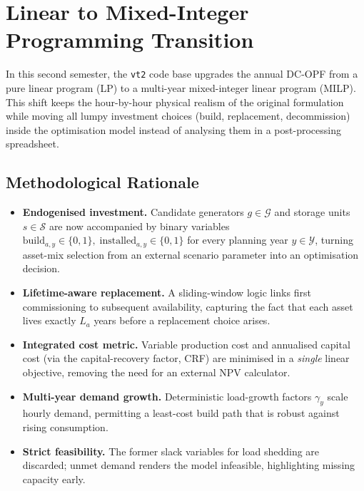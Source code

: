 \newpage
\section{Linear to Mixed-Integer Programming Transition}
\label{sec:MILP_transition}

In this second semester, the \texttt{vt2} code base upgrades the annual DC-OPF from 
a pure linear program (LP) to a multi-year mixed-integer linear program (MILP).  
This shift keeps the hour-by-hour physical realism of the original formulation while 
moving all lumpy investment choices (build, replacement, decommission) inside the 
optimisation model instead of analysing them in a post-processing spreadsheet.

\subsection{Methodological Rationale}
\label{ssec:MILP_methodology}

\begin{itemize}
    \item \textbf{Endogenised investment.}  
          Candidate generators $g\in\mathcal{G}$ and storage units $s\in\mathcal{S}$ 
          are now accompanied by binary variables
          \(
              \text{build}_{a,y}\in\{0,1\},\;
              \text{installed}_{a,y}\in\{0,1\}
          \)
          for every planning year $y\in\mathcal{Y}$, turning asset-mix selection from 
          an external scenario parameter into an optimisation decision.

    \item \textbf{Lifetime-aware replacement.}  
          A sliding-window logic links first commissioning to subsequent availability, 
          capturing the fact that each asset lives exactly $L_a$ years before a 
          replacement choice arises.

    \item \textbf{Integrated cost metric.}  
          Variable production cost and annualised capital cost (via the capital-recovery 
          factor, CRF) are minimised in a \emph{single} linear objective, removing the 
          need for an external NPV calculator.

    \item \textbf{Multi-year demand growth.}  
          Deterministic load-growth factors $\gamma_y$ scale hourly demand, permitting a 
          least-cost build path that is robust against rising consumption.

    \item \textbf{Strict feasibility.}  
          The former slack variables for load shedding are discarded; unmet demand renders 
          the model infeasible, highlighting missing capacity early.
\end{itemize}

